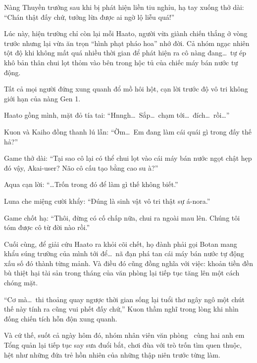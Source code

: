 \documentclass[../main.tex]{subfiles}
\begin{document}
Nàng Thuyền trưởng sau khi bị phát hiện liền tiu nghỉu, hạ tay xuống thở dài: ``Chán thật đấy chứ, tưởng lừa được ai ngờ lộ liễu quá!''

Lúc này, hiện trường chỉ còn lại mỗi Haato, người vừa giành chiến thắng ở vòng trước nhưng lại vừa ăn trọn ``hình phạt pháo hoa'' nhớ đời. Cả nhóm ngạc nhiên tột độ khi không mất quá nhiều thời gian để phát hiện ra cô nàng đang\dots\ tự ép khô bản thân chui lọt thỏm vào bên trong hộc tủ của chiếc máy bán nước tự động.

Tất cả mọi người đứng xung quanh đổ mồ hôi hột, cạn lời trước độ vô tri không giới hạn của nàng Gen 1.

Haato gồng mình, mặt đỏ tía tai: ``Hnngh\dots\ Sắp\dots\ chạm tới\dots\ đích\dots\ rồi\dots''

Kuon và Kaiho đồng thanh lú lẫn: ``Ờm\dots\ Em đang làm cái quái gì trong đấy thế hả?''

Game thở dài: ``Tại sao cô lại có thể chui lọt vào cái máy bán nước ngọt chật hẹp đó vậy, Akai-user? Não cô cấu tạo bằng cao su à?''

Aqua cạn lời: ``\dots Trốn trong đó để làm gì thế không biết.''

Luna che miệng cười khẩy: ``Đúng là sinh vật vô tri thật sự á-nora.''

Game chốt hạ: ``Thôi, đừng có cố chấp nữa, chui ra ngoài mau lên. Chúng tôi tóm được cô từ đời nào rồi.''

Cuối cùng, để giải cứu Haato ra khỏi cõi chết, họ đành phải gọi Botan mang khẩu súng trường của mình tới để\dots\ nã đạn phá tan cái máy bán nước tự động xấu số đó thành từng mảnh. Và điều đó cũng đồng nghĩa với việc: khoản tiền đền bù thiệt hại tài sản trong tháng của văn phòng lại tiếp tục tăng lên một cách chóng mặt.

``Cơ mà\dots\ thi thoảng quay ngược thời gian sống lại tuổi thơ ngây ngô một chút thế này tính ra cũng vui phết đấy chứ,'' Kuon thầm nghĩ trong lòng khi nhìn đống chiến tích hỗn độn xung quanh.

Và cứ thế, suốt cả ngày hôm đó, nhóm nhân viên văn phòng \hll\ cùng hai anh em Tổng quản lại tiếp tục say sưa đuổi bắt, chơi đùa với trò trốn tìm quen thuộc, hệt như những đứa trẻ hồn nhiên của những thập niên trước từng làm.
\end{document}
